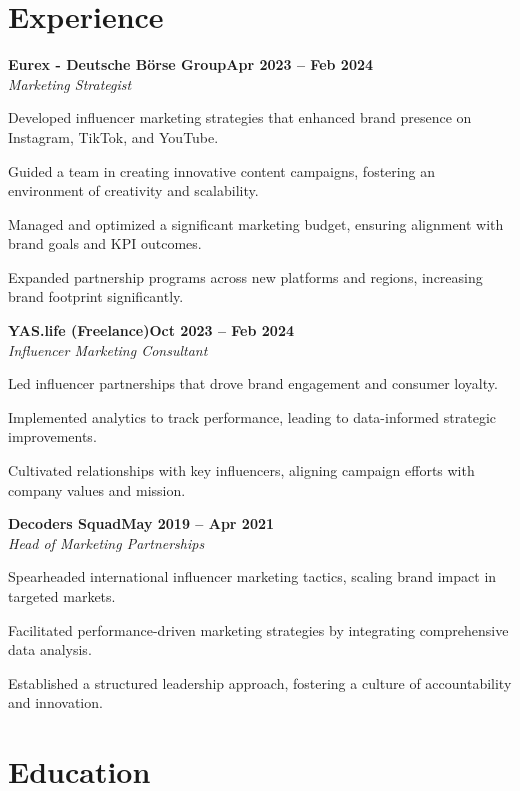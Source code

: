 \documentclass[letterpaper,10pt]{article}
\newcommand{\heading}[2]{
  \hspace{10pt}#1\hfill#2\\
}
\newcommand{\headingBf}[2]{
  \heading{\textbf{#1}}{\textbf{#2}}
}
\newcommand{\headingIt}[2]{
  \heading{\textit{#1}}{\textit{#2}}
}
\newenvironment{resume_list}{
  \vspace{-7pt}
  \begin{itemize}[itemsep=-2px, parsep=1pt, leftmargin=20pt, labelsep=10pt]
}{
  \end{itemize}
}
\begin{document}
\section{Experience}

\headingBf{Eurex - Deutsche Börse Group}{Apr 2023 -- Feb 2024}
\headingIt{Marketing Strategist}{}
\begin{resume_list}
  \item Developed influencer marketing strategies that enhanced brand presence on Instagram, TikTok, and YouTube.
  \item Guided a team in creating innovative content campaigns, fostering an environment of creativity and scalability.
  \item Managed and optimized a significant marketing budget, ensuring alignment with brand goals and KPI outcomes.
  \item Expanded partnership programs across new platforms and regions, increasing brand footprint significantly.
\end{resume_list}

\vspace{-0.5em}
\headingBf{YAS.life (Freelance)}{Oct 2023 -- Feb 2024}
\headingIt{Influencer Marketing Consultant}{}
\begin{resume_list}
  \item Led influencer partnerships that drove brand engagement and consumer loyalty.
  \item Implemented analytics to track performance, leading to data-informed strategic improvements.
  \item Cultivated relationships with key influencers, aligning campaign efforts with company values and mission.
\end{resume_list}

\vspace{-0.5em}
\headingBf{Decoders Squad}{May 2019 -- Apr 2021}
\headingIt{Head of Marketing Partnerships}{}
\begin{resume_list}
  \item Spearheaded international influencer marketing tactics, scaling brand impact in targeted markets.
  \item Facilitated performance-driven marketing strategies by integrating comprehensive data analysis.
  \item Established a structured leadership approach, fostering a culture of accountability and innovation.
\end{resume_list}

\section{Education}
\end{document}
